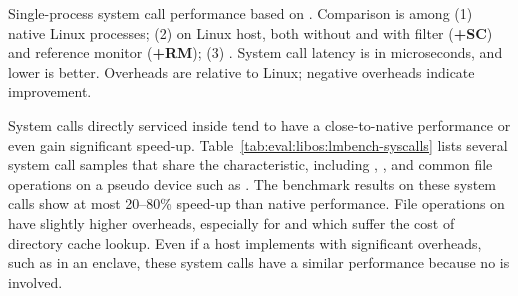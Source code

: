 \label{sec:eval:libos:syscalls}


\begin{table}[t!b!]

\caption{Single-process system call performance based on \lmbench{}. Comparison is among (1) native Linux processes; (2) \graphene{} on Linux host, both without and with \seccomp{} filter ({\bf +SC}) and reference monitor ({\bf +RM}); (3) \graphenesgx{}.
System call latency is in microseconds, and lower is better.
Overheads are relative to Linux; negative overheads indicate improvement.} 
\label{tab:eval:libos:lmbench-syscalls}
\end{table}


System calls directly serviced
inside \thelibos{}
tend to have a close-to-native performance
or even gain significant speed-up.
Table~\ref{tab:eval:libos:lmbench-syscalls}
lists several system call samples that share the characteristic,
including ,
, and common file operations on a pseudo device such as .
The benchmark results on these system calls
show at most 20--80\% speed-up
than native performance.
File operations on  have
slightly higher overheads,
especially for  and 
which suffer the cost
of directory cache lookup.
Even if a host implements \thehostabi{} with significant overheads,
such as in an \sgx{} enclave,
these system calls have a similar performance because no \hostapi{} is involved.









